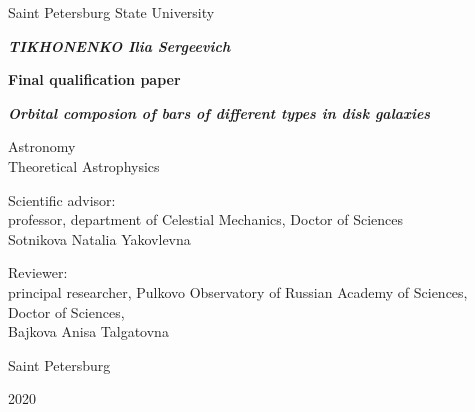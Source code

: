 \begin{titlepage}
  \centering
  {Saint Petersburg State University \par}
  
  \vspace{1.5cm}

  {\bfseries \itshape\MakeUppercase{Tikhonenko} Ilia Sergeevich\par}
  \vspace{0.5\baselineskip}
  {\bfseries Final qualification paper\par}
  \vspace{0.5\baselineskip}
  {\bfseries \itshape Orbital composion of bars of different types in disk galaxies\par}
  \vspace{1cm}
  {
    ${}$\\ 
    ${}$\\
    Astronomy\\
    Theoretical Astrophysics
  }
  \vspace{1cm}
  \begin{flushright}
    \parbox{0.5\textwidth}{
      {Scientific advisor:} \\
      professor, department of Celestial Mechanics, Doctor of Sciences\\
      Sotnikova Natalia Yakovlevna
    }
  \end{flushright}
  \par
  \begin{flushright}
    \parbox{0.5\textwidth}{
      {Reviewer:} \\
      principal researcher, Pulkovo Observatory of Russian Academy of Sciences,
      Doctor of Sciences,\\
      Bajkova Anisa Talgatovna
    }
  \end{flushright}
  
  \vfill
  
  {Saint Petersburg \par}
  {2020}
\end{titlepage}
